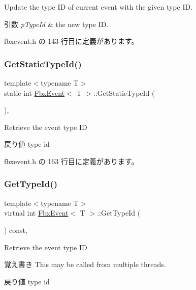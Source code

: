 Update the type ID of current event with the given type ID. 
\begin{DoxyParams}{引数}
{\em p\+Type\+Id} & the new type ID. \\
\hline
\end{DoxyParams}


 fbxevent.\+h の 143 行目に定義があります。

\mbox{\label{class_fbx_event_a9f2329973ee8cb60860d004cc2823c70}} 
\subsubsection{\texorpdfstring{Get\+Static\+Type\+Id()}{GetStaticTypeId()}}
{\footnotesize\ttfamily template$<$typename T$>$ \\
static int \hyperlink{class_fbx_event}{Fbx\+Event}$<$ T $>$\+::Get\+Static\+Type\+Id (\begin{DoxyParamCaption}{ }\end{DoxyParamCaption})\hspace{0.3cm}{\ttfamily [inline]}, {\ttfamily [static]}}

Retrieve the event type ID \begin{DoxyReturn}{戻り値}
type id 
\end{DoxyReturn}


 fbxevent.\+h の 163 行目に定義があります。

\mbox{\label{class_fbx_event_a96ae7ea5ee46f040f6493f6acecd5bba}} 
\subsubsection{\texorpdfstring{Get\+Type\+Id()}{GetTypeId()}}
{\footnotesize\ttfamily template$<$typename T$>$ \\
virtual int \hyperlink{class_fbx_event}{Fbx\+Event}$<$ T $>$\+::Get\+Type\+Id (\begin{DoxyParamCaption}{ }\end{DoxyParamCaption}) const\hspace{0.3cm}{\ttfamily [inline]}, {\ttfamily [virtual]}}

Retrieve the event type ID \begin{DoxyNote}{覚え書き}
This may be called from multiple threads. 
\end{DoxyNote}
\begin{DoxyReturn}{戻り値}
type id 
\end{DoxyReturn}


